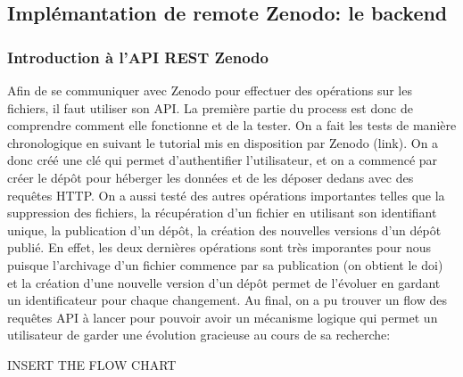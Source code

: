 \documentclass[11pt]{article}
\begin{document}
\subsection{Implémantation de remote Zenodo: le backend}
\label{sec:org2f9f93f}

\subsubsection{Introduction à l'API REST Zenodo}
\label{sec:orgabf2645}
Afin de se communiquer avec Zenodo pour effectuer des
opérations sur les fichiers, il faut utiliser son API. La première
partie du process est donc de comprendre comment elle fonctionne et de
la tester. On a fait les tests de manière chronologique en suivant le
tutorial mis en disposition par Zenodo (link). On a donc créé une clé
qui permet d'authentifier l'utilisateur, et on a commencé par créer le
dépôt pour héberger les données et de les déposer dedans avec des
requêtes HTTP. On a aussi testé des autres opérations importantes
telles que la suppression des fichiers, la récupération d'un fichier
en utilisant son identifiant unique, la publication d'un dépôt, la
création des nouvelles versions d'un dépôt publié. En effet, les deux
dernières opérations sont très imporantes pour nous puisque
l'archivage d'un fichier commence par sa publication (on obtient le
doi) et la création d'une nouvelle version d'un dépôt permet de
l'évoluer en gardant un identificateur pour chaque changement.
Au final, on a pu trouver un flow des requêtes API à lancer pour
pouvoir avoir un mécanisme logique qui permet un utilisateur de garder
une évolution gracieuse au cours de sa recherche:

INSERT THE FLOW CHART
\end{document}

